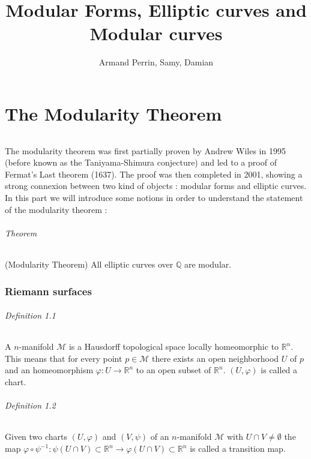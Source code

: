 \documentclass[letterpaper,10pt]{article}
\title{Modular Forms, Elliptic curves and Modular curves}
\author{Armand Perrin, Samy, Damian}
\begin{document}
\maketitle%
\part{The Modularity Theorem}

\paragraph{}The modularity theorem was first partially proven by Andrew Wiles in 1995 (before known as the Taniyama-Shimura conjecture) 
and led to a proof of Fermat's Last theorem (1637). The proof was then completed in 2001, showing a strong connexion between 
two kind of objects : modular forms and elliptic curves. In this part we will introduce some notions in order to understand 
the statement of the modularity theorem : 

\paragraph{Theorem } (Modularity Theorem) All elliptic curves over $\mathbb{Q}$ are modular.



\section{Riemann surfaces}%

\paragraph{Definition 1.1} A $n$-manifold $\mathcal{M}$ is a Hausdorff topological space locally homeomorphic to $\mathbb{R}^n$.
This means that for every point $p \in \mathcal{M}$ there exists an open neighborhood $U$ of $p$ and an homeomorphism $\varphi : U \to \mathbb{R}^n$ to an open subset
of $\mathbb{R}^n$. $(U,\varphi)$ is called a chart.


\paragraph{Definition 1.2} Given two charts $(U,\varphi)$ and $(V,\psi)$ of an $n$-manifold $\mathcal{M}$ with $U\cap V \neq \emptyset$ the map
$\varphi \circ \psi^{-1} : \psi(U\cap V) \subset \mathbb{R}^n \to \varphi(U\cap V) \subset \mathbb{R}^n$ is called a transition map.
\end{document}
